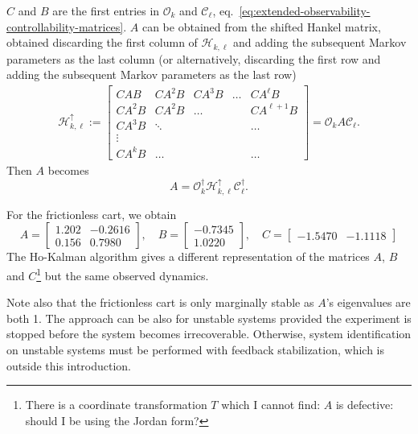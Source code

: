 $C$ and $B$ are the first entries in $\mathcal{O}_k$ and $\mathcal{C}_\ell$, eq.~\eqref{eq:extended-observability-controllability-matrices}. $A$ can be obtained from the shifted Hankel matrix, obtained discarding the first column of $\mathcal{H}_{k,\ell}$ and adding the subsequent Markov parameters as the last column (or alternatively, discarding the first row and adding the subsequent Markov parameters as the last row)
\begin{align*}
  \mathcal{H}_{k,\ell}^\uparrow :=
  \begin{bmatrix}
    CAB & CA^2B & CA^3 B & \ldots & CA^\ell B \\
    CA^2B & CA^2B & \ldots & & CA^{\ell+1}B \\
    CA^3B & \ddots & & & \ldots \\
    \vdots \\
    CA^kB & \ldots & & & \ldots
  \end{bmatrix} = \mathcal{O}_k A \mathcal{C}_\ell.
\end{align*}
Then $A$ becomes
\begin{equation*}
  A = \mathcal{O}_k^\dagger\mathcal{H}_{k,\ell}^\uparrow \mathcal{C}_\ell^\dagger.
\end{equation*}

For the frictionless cart, we obtain
\begin{equation*}
  A =
  \begin{bmatrix}
    1.202 & -0.2616 \\
    0.156 &  0.7980
  \end{bmatrix},\quad B =
  \begin{bmatrix}
    -0.7345 \\
    1.0220
  \end{bmatrix},\quad C =
  \begin{bmatrix}
    -1.5470 & -1.1118
  \end{bmatrix}
\end{equation*}
The Ho-Kalman algorithm gives a different representation of the matrices $A$, $B$ and $C$\footnote{There is a coordinate transformation $T$ which I cannot find: $A$ is defective: should I be using the Jordan form?} but the same observed dynamics.

Note also that the frictionless cart is only marginally stable as $A$'s eigenvalues are both 1. The approach can be also for unstable systems provided the experiment is stopped before the system becomes irrecoverable. Otherwise, system identification on unstable systems must be performed with feedback stabilization, which is outside this introduction.

